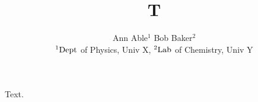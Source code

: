 \documentclass{article}
\begin{document}
\title{T}
\author{Ann Able$^{1}$ Bob Baker$^{2}$\\ ${\rm ^1Dept}$ of Physics, Univ X, ${\rm ^2Lab}$ of Chemistry, Univ Y}
\maketitle
Text.
\end{document}
